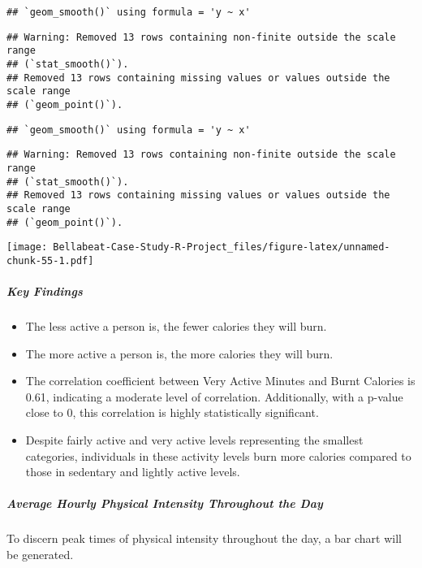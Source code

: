 \documentclass[
]{article}
\providecommand{\tightlist}{%
  \setlength{\itemsep}{0pt}\setlength{\parskip}{0pt}}
\begin{document}
\begin{verbatim}
## `geom_smooth()` using formula = 'y ~ x'
\end{verbatim}

\begin{verbatim}
## Warning: Removed 13 rows containing non-finite outside the scale range
## (`stat_smooth()`).
## Removed 13 rows containing missing values or values outside the scale range
## (`geom_point()`).
\end{verbatim}

\begin{verbatim}
## `geom_smooth()` using formula = 'y ~ x'
\end{verbatim}

\begin{verbatim}
## Warning: Removed 13 rows containing non-finite outside the scale range
## (`stat_smooth()`).
## Removed 13 rows containing missing values or values outside the scale range
## (`geom_point()`).
\end{verbatim}

\texttt{[image: Bellabeat-Case-Study-R-Project\_files/figure-latex/unnamed-chunk-55-1.pdf]}

\hypertarget{key-findings-1}{%
\subparagraph{Key Findings}\label{key-findings-1}}

\begin{itemize}
\tightlist
\item
  The less active a person is, the fewer calories they will burn.
\item
  The more active a person is, the more calories they will burn.
\item
  The correlation coefficient between Very Active Minutes and Burnt
  Calories is 0.61, indicating a moderate level of correlation.
  Additionally, with a p-value close to 0, this correlation is highly
  statistically significant.
\item
  Despite fairly active and very active levels representing the smallest
  categories, individuals in these activity levels burn more calories
  compared to those in sedentary and lightly active levels.
\end{itemize}

\hypertarget{average-hourly-physical-intensity-throughout-the-day}{%
\subparagraph{Average Hourly Physical Intensity Throughout the
Day}\label{average-hourly-physical-intensity-throughout-the-day}}

To discern peak times of physical intensity throughout the day, a bar
chart will be generated.
\end{document}
